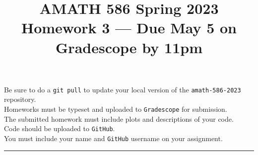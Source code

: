 \documentclass[10pt]{amsart}
\begin{document}
\pagestyle{empty}

\newcommand{\mline}{\vspace{.2in}\hrule\vspace{.2in}}


\title{\bf { AMATH 586 Spring 2023 \\ Homework 3 ---
Due May 5 on Gradescope by 11pm} }
\maketitle
\begin{center} Be sure to do a {\tt git pull} to update your local
  version of the {\tt amath-586-2023} repository.\\  Homeworks must be
  typeset and uploaded to {\tt Gradescope} for submission.\\
  The submitted homework must include plots and descriptions of your code.\\
  Code should be uploaded to {\tt GitHub}.\\
  You must include your name and {\tt GitHub} username on your assignment.
  \end{center}

  \mline
  
\end{document}
